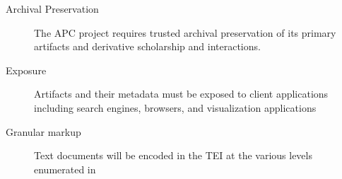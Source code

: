 \begin{description}
  \item[Archival Preservation] The APC project requires trusted archival preservation of its primary artifacts and derivative scholarship and interactions.
  \item[Exposure] Artifacts and their metadata must be exposed to client applications including search engines, browsers, and visualization applications
  \item[Granular markup] Text documents will be encoded in the TEI at the various levels enumerated in \cite{tei_sig_on_libraries_best_2011} 
\end{description}
